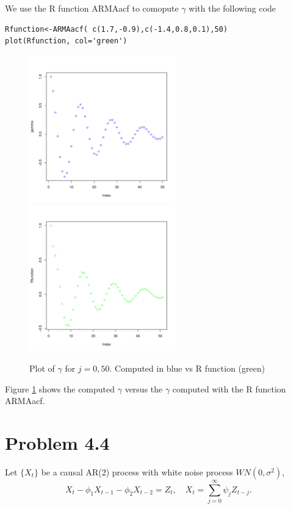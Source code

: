 \documentclass[11pt, oneside]{article}   	%
\begin{document}
We use the R function ARMAacf to comopute $\gamma$ with the following code
\begin{lstlisting}
Rfunction<-ARMAacf( c(1.7,-0.9),c(-1.4,0.8,0.1),50)
plot(Rfunction, col='green')
\end{lstlisting}


\begin{figure}[H] %
   \centering
   \includegraphics[width=2.5in]{Rplots} 
    \includegraphics[width=2.5in]{Rfunction} 
   \caption{Plot of $\gamma$ for $j = 0, 50$. Computed in blue vs R function (green)}
   \label{fig:gamma}
\end{figure}
Figure \ref{fig:gamma} shows the computed $\gamma$ versus the $\gamma$ computed with the R function ARMAacf.


\clearpage
\section{Problem 4.4}
Let $\{X_{t}\}$ be a causal AR(2) process with white noise process $WN(0,\sigma^{2})$,
\begin{equation}\label{eq:main}
X_{t}-\phi_{1}X_{t-1}-\phi_{2}X_{t-2} = Z_{t}, \quad X_{t} = \sum_{j=0}^{\infty}\psi_{j}Z_{t-j}.
\end{equation}
\end{document}
